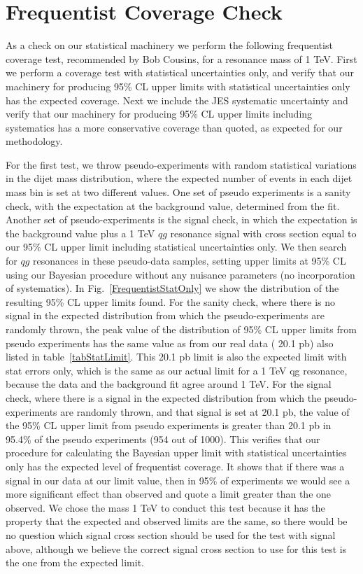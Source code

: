 \section{Frequentist Coverage Check}
\label{appStatCheck}


As a check on our statistical machinery we perform the following 
frequentist coverage test, recommended by Bob Cousins, for a 
resonance mass of 1 TeV.  First we perform a coverage test with
statistical uncertainties only, and verify that our machinery for 
producing 95\% CL upper limits with statistical uncertainties only has the expected 
coverage. Next we include the JES systematic uncertainty and verify
that our machinery for producing 95\% CL upper limits including systematics 
has a more conservative coverage than quoted, as expected for our 
methodology.


For the first test, we throw pseudo-experiments with random statistical 
variations in the dijet mass distribution, where the expected 
number of events in each dijet mass bin is set at two different 
values.  One set of pseudo experiments is a sanity check, with the expectation at 
the background value, determined from the fit. Another set of pseudo-experiments
is the signal check, in which
the expectation is the background value plus a 1 TeV $qg$ resonance signal
with cross section equal to our 95\% CL upper limit including statistical 
uncertainties only.  
We then search for $qg$ resonances in these pseudo-data samples, setting
upper limits at 95\% CL using our Bayesian procedure without any nuisance
parameters (no incorporation of systematics).
In Fig.~\ref{FrequentistStatOnly} we show the distribution of the resulting
95\% CL upper limits found. For the sanity check, where there is no signal in the 
expected distribution from which the pseudo-experiments are randomly thrown, the 
peak value of the distribution of 95\% CL upper limits from pseudo experiments 
has the same value as from our real data ( 20.1 pb) also listed in 
table~\ref{tabStatLimit}. This 20.1 pb limit is also the expected 
limit with stat errors only, which is the same as our actual limit for 
a 1 TeV qg resonance, because the data and the background fit agree around 1 TeV.
For the signal check, where 
there is a signal in the expected distribution from which the
pseudo-experiments are randomly thrown, and that signal is set at 20.1 pb, the 
value of the 95\% CL upper limit from pseudo experiments is greater than
20.1 pb in 95.4\% of the pseudo experiments (954 out of 1000). This verifies
that our procedure for calculating the Bayesian upper limit with statistical 
uncertainties only has the expected level of frequentist coverage. It shows that
if there was a signal in our data at our limit value, then in 95\% of experiments
we would see a more significant effect than observed and quote a limit greater than 
the one observed.
We chose the mass 1 TeV to conduct this test because it has the 
property that the expected and observed limits are the same, so there would 
be no question which signal cross section should be used for the test with 
signal above, although we believe the correct signal cross section to use
for this test is the one from the expected limit.


